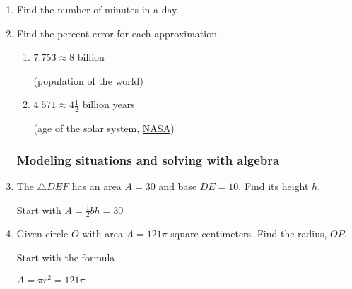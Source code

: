 \begin{enumerate}
\item Find the number of minutes in a day. \vspace{2cm}

\item Find the percent error for each approximation.
  \begin{multicols}{2}
    \begin{enumerate}[itemsep=4cm]
      \item $7.753 \approx 8$ billion \par (population of the world)    
      \item $4.571 \approx 4 \frac{1}{2}$ billion years \par (age of the solar system, \href{https://solarsystem.nasa.gov/solar-system/our-solar-system/in-depth/}{NASA})
    \end{enumerate}
  \end{multicols}

\newpage
\subsubsection*{Modeling situations and solving with algebra}
\item The $\triangle DEF$ has an area $A=30$ and base $DE=10$. Find its height $h$.
  \begin{multicols}{2}
    Start with 
    $\displaystyle A = \frac{1}{2} bh = 30$ \par
  \end{multicols}

\item Given circle $O$ with area $A=121 \pi$ square centimeters. Find the radius, $OP$.
  \begin{multicols}{2}
     \par
   Start with the formula \par \smallskip
  $A = \pi r^2 = 121 \pi$
  \end{multicols}


\end{enumerate}
